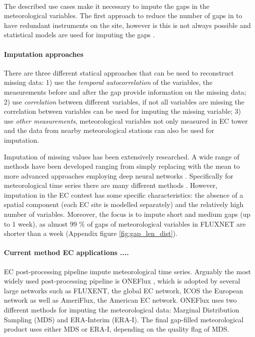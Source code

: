 \documentclass{article}
\begin{document}
\paragraph{} The described use cases make it necessary to impute the gaps in the meteorological variables. The first approach to reduce the number of gaps in to have redundant instruments on the site, however is this is not always possible and statistical models are used for imputing the gaps \cite{aubinet_eddy_2012-1}.

\paragraph{Imputation approaches} There are three different statical approaches that can be used to reconstruct missing data: 1) use the \emph{temporal autocorrelation} of the variables, the measurements  before and after the gap provide information on the missing data; 2) use \emph{correlation} between different variables, if not all variables are missing the correlation between variables can be used for imputing the missing variable; 3) use \emph{other measurements}, meteorological variables not only measured in EC tower and the data from nearby meteorological stations can also be used for imputation.

Imputation of missing values has been extensively researched. A wide range of methods have been developed ranging from simply replacing with the mean to more advanced approaches employing deep neural networks \cite{fang_time_2020-1, buuren_mice_2011, du_saits_2022-1, zhang_dual-head_2021-2, cao_brits_nodate}. Specifically for meteorological time series there are many different methods \cite{costa_gap_2021, jing_multi-imputation_2022}. However, imputation in the EC contest has some specific characteristics: the absence of a spatial component (each EC site is modelled separately) and the relatively high number of variables. Moreover, the focus is to impute short and medium gaps (up to 1 week), as almost 99 \% of gaps of meteorological variables in FLUXNET are shorter than a week (Appendix figure \ref{fig:gap_len_dist}). 

\paragraph{Current method EC applications ....} EC post-processing pipeline impute meteorological time series. Arguably the most widely used post-processing pipeline is ONEFlux \cite{pastorello_fluxnet2015_2020}, which is adopted by several large networks such as FLUXENT, the global EC network, ICOS the European network as well as AmeriFlux, the American EC network.
ONEFlux uses two different methods for imputing the meteorological data: Marginal Distribution Sampling (MDS) and ERA-Interim (ERA-I). The final gap-filled meteorological product uses either MDS or ERA-I, depending on the quality flag of MDS.
\end{document}
